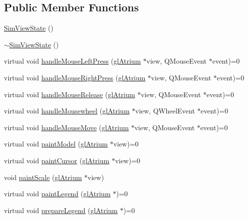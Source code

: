 \subsection*{Public Member Functions}
\begin{DoxyCompactItemize}
\item 
\hyperlink{class_sim_view_state_a25716f67bc5a503232f0cda26ae54efd}{Sim\+View\+State} ()
\item 
\hyperlink{class_sim_view_state_a146b34bbbf4107030f0f19da24f45985}{$\sim$\+Sim\+View\+State} ()
\item 
virtual void \hyperlink{class_sim_view_state_a88e0bdb8f9bc192aafdd03cfcfedb739}{handle\+Mouse\+Left\+Press} (\hyperlink{classgl_atrium}{gl\+Atrium} $\ast$view, Q\+Mouse\+Event $\ast$event)=0
\item 
virtual void \hyperlink{class_sim_view_state_ae19144be611a82cdeaf6fa14e51dd2b8}{handle\+Mouse\+Right\+Press} (\hyperlink{classgl_atrium}{gl\+Atrium} $\ast$view, Q\+Mouse\+Event $\ast$event)=0
\item 
virtual void \hyperlink{class_sim_view_state_ade4b50513760c26f2fee922d9490fe9f}{handle\+Mouse\+Release} (\hyperlink{classgl_atrium}{gl\+Atrium} $\ast$view, Q\+Mouse\+Event $\ast$event)=0
\item 
virtual void \hyperlink{class_sim_view_state_a12e4d1b637498ebc47cf1bc3d73e0f6f}{handle\+Mousewheel} (\hyperlink{classgl_atrium}{gl\+Atrium} $\ast$view, Q\+Wheel\+Event $\ast$event)=0
\item 
virtual void \hyperlink{class_sim_view_state_aed57f0c2dfd5b883ab967b06c4264809}{handle\+Mouse\+Move} (\hyperlink{classgl_atrium}{gl\+Atrium} $\ast$view, Q\+Mouse\+Event $\ast$event)=0
\item 
virtual void \hyperlink{class_sim_view_state_a495ab39e6dfdf96cca95a16bb773fae5}{paint\+Model} (\hyperlink{classgl_atrium}{gl\+Atrium} $\ast$view)=0
\item 
virtual void \hyperlink{class_sim_view_state_a837acc68609fe299ec477ebccbaab7b7}{paint\+Cursor} (\hyperlink{classgl_atrium}{gl\+Atrium} $\ast$view)=0
\item 
void \hyperlink{class_sim_view_state_a4b4827ed55ec2cfd5b2ceb6c977425cf}{paint\+Scale} (\hyperlink{classgl_atrium}{gl\+Atrium} $\ast$view)
\item 
virtual void \hyperlink{class_sim_view_state_aaf43f6d62a2a9bc6c3e52adf0f56b166}{paint\+Legend} (\hyperlink{classgl_atrium}{gl\+Atrium} $\ast$)=0
\item 
virtual void \hyperlink{class_sim_view_state_a1ddc84529f91fceb9b96096639ba3aca}{prepare\+Legend} (\hyperlink{classgl_atrium}{gl\+Atrium} $\ast$)=0

\end{DoxyCompactItemize}

